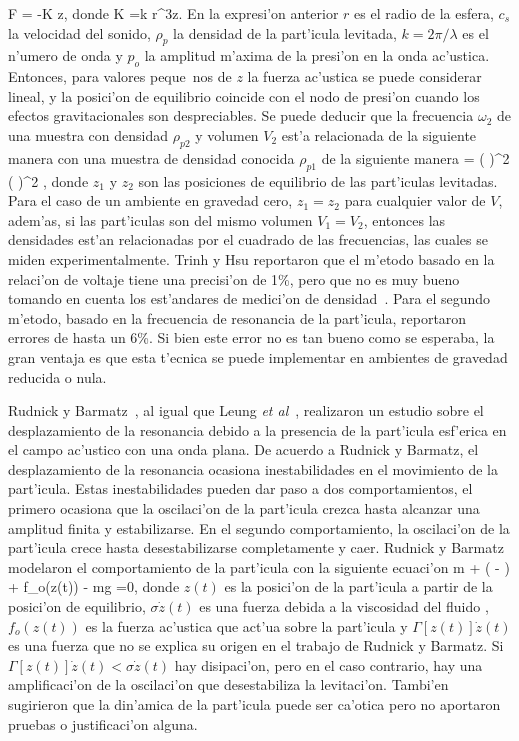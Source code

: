 \BE
F = -K z,
\EE
donde
\BE
K =k r^3z.
\EE
En la expresi'on anterior $r$ es el radio de la esfera, $c_s$ la velocidad del sonido, $\rho_p$ la densidad de la part'icula
levitada, $k=2\pi/\lambda$ es el n'umero de onda y $p_o$ la amplitud m'axima  de la presi'on en la onda ac'ustica. 
Entonces, para valores peque~nos de $z$ la fuerza ac'ustica
se puede considerar lineal, y la posici'on de equilibrio coincide con el nodo de presi'on cuando los efectos
gravitacionales son despreciables. Se puede deducir que la frecuencia  $\omega_2$ de una muestra con 
densidad  $\rho_{p2}$ y volumen $V_2$ est'a relacionada de la siguiente manera con una muestra de densidad
conocida $\rho_{p1}$ de la siguiente manera
\BE
{} = \left(  \right)^2 \left(  \right)^2
,
\EE
donde $z_1$ y $z_2$ son las posiciones de equilibrio de las part'iculas levitadas. Para el caso de un ambiente
en gravedad cero, $z_1=z_2$ para cualquier valor de $V$, adem'as, si las part'iculas son del mismo
volumen $V_1 = V_2$, entonces las densidades est'an relacionadas por el cuadrado de las frecuencias, las cuales 
se miden experimentalmente.  
Trinh y Hsu reportaron que el m'etodo basado en la relaci'on de voltaje tiene una precisi'on de 1\%, pero que no es muy bueno
tomando en cuenta los est'andares de medici'on de densidad~\cite{trinh86}.  Para el segundo m'etodo, basado en la
frecuencia de resonancia de la part'icula, reportaron errores de hasta un 6\%.  Si bien este error no es tan bueno
como se esperaba, la gran ventaja es que esta t'ecnica se puede implementar en ambientes de gravedad reducida
o nula.

Rudnick y Barmatz~\cite{rudnick90}, al igual que Leung {\it et al}~\cite{leung82}, 
realizaron un estudio sobre el desplazamiento de la resonancia debido a la presencia de la part'icula esf'erica
en el campo ac'ustico con una onda plana.   De acuerdo a Rudnick y Barmatz, el desplazamiento de la 
resonancia ocasiona inestabilidades 
en el movimiento de la part'icula. Estas inestabilidades pueden
dar paso a dos comportamientos, el primero ocasiona que la oscilaci'on de la part'icula crezca hasta alcanzar una
amplitud finita y estabilizarse. En el segundo comportamiento, la oscilaci'on de la part'icula crece hasta desestabilizarse
completamente y caer. Rudnick y Barmatz modelaron el comportamiento de la part'icula con la siguiente ecuaci'on
\BE
m  + \left( \sigma - \Gamma [z(t)] \right)  
+ f_o(z(t)) - mg =0,
\EE
donde $z(t)$ es la posici'on de la part'icula a partir de la posici'on de equilibrio, $\sigma {\dot z}(t)$ 
es una fuerza debida a la viscosidad del fluido , $f_o(z(t))$ es la fuerza ac'ustica que act'ua sobre la part'icula  
y  $\Gamma [z(t)] {\dot z}(t) $ es una fuerza que no se explica su origen en el trabajo de Rudnick y Barmatz. Si
$\Gamma [z(t)] {\dot z}(t) < \sigma {\dot z}(t)$  hay disipaci'on, pero en el caso contrario,
hay una amplificaci'on de la oscilaci'on que desestabiliza la levitaci'on.
Tambi'en sugirieron que la din'amica de la part'icula
puede ser ca'otica pero no aportaron pruebas o justificaci'on alguna.

